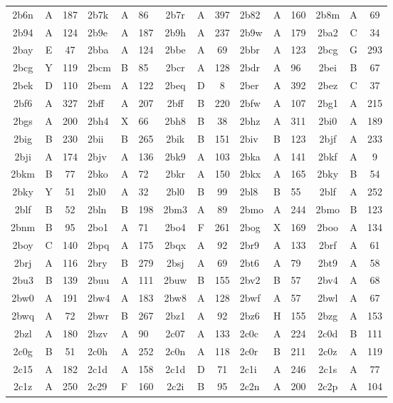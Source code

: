 \begin{longtable}{|c|c|c| a|a|a| c|c|c| a|a|a| c|c|c|}
2b6n & A & 187 & 2b7k & A & 86 & 2b7r & A & 397 & 2b82 & A & 160 & 2b8m & A & 69\\
2b94 & A & 124 & 2b9e & A & 187 & 2b9h & A & 237 & 2b9w & A & 179 & 2ba2 & C & 34\\
2bay & E & 47 & 2bba & A & 124 & 2bbe & A & 69 & 2bbr & A & 123 & 2bcg & G & 293\\
2bcg & Y & 119 & 2bcm & B & 85 & 2bcr & A & 128 & 2bdr & A & 96 & 2bei & B & 67\\
2bek & D & 110 & 2bem & A & 122 & 2beq & D & 8 & 2ber & A & 392 & 2bez & C & 37\\
2bf6 & A & 327 & 2bff & A & 207 & 2bff & B & 220 & 2bfw & A & 107 & 2bg1 & A & 215\\
2bgs & A & 200 & 2bh4 & X & 66 & 2bh8 & B & 38 & 2bhz & A & 311 & 2bi0 & A & 189\\
2big & B & 230 & 2bii & B & 265 & 2bik & B & 151 & 2biv & B & 123 & 2bjf & A & 233\\
2bji & A & 174 & 2bjv & A & 136 & 2bk9 & A & 103 & 2bka & A & 141 & 2bkf & A & 9\\
2bkm & B & 77 & 2bko & A & 72 & 2bkr & A & 150 & 2bkx & A & 165 & 2bky & B & 54\\
2bky & Y & 51 & 2bl0 & A & 32 & 2bl0 & B & 99 & 2bl8 & B & 55 & 2blf & A & 252\\
2blf & B & 52 & 2bln & B & 198 & 2bm3 & A & 89 & 2bmo & A & 244 & 2bmo & B & 123\\
2bnm & B & 95 & 2bo1 & A & 71 & 2bo4 & F & 261 & 2bog & X & 169 & 2boo & A & 134\\
2boy & C & 140 & 2bpq & A & 175 & 2bqx & A & 92 & 2br9 & A & 133 & 2brf & A & 61\\
2brj & A & 116 & 2bry & B & 279 & 2bsj & A & 69 & 2bt6 & A & 79 & 2bt9 & A & 58\\
2bu3 & B & 139 & 2buu & A & 111 & 2buw & B & 155 & 2bv2 & B & 57 & 2bv4 & A & 68\\
2bw0 & A & 191 & 2bw4 & A & 183 & 2bw8 & A & 128 & 2bwf & A & 57 & 2bwl & A & 67\\
2bwq & A & 72 & 2bwr & B & 267 & 2bz1 & A & 92 & 2bz6 & H & 155 & 2bzg & A & 153\\
2bzl & A & 180 & 2bzv & A & 90 & 2c07 & A & 133 & 2c0c & A & 224 & 2c0d & B & 111\\
2c0g & B & 51 & 2c0h & A & 252 & 2c0n & A & 118 & 2c0r & B & 211 & 2c0z & A & 119\\
2c15 & A & 182 & 2c1d & A & 158 & 2c1d & D & 71 & 2c1i & A & 246 & 2c1s & A & 77\\
2c1z & A & 250 & 2c29 & F & 160 & 2c2i & B & 95 & 2c2n & A & 200 & 2c2p & A & 104\\

\end{longtable}
